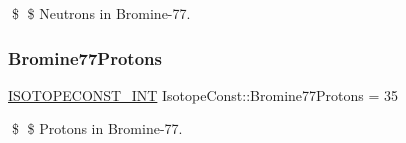 \$ \$ Neutrons in Bromine-\/77. \mbox{\label{group___isotope_const-_bromine-_br77_ga1ea5fd1c2a7636d793f516823bf8c1a8}} 
\subsubsection{\texorpdfstring{Bromine77\+Protons}{Bromine77Protons}}
{\footnotesize\ttfamily \mbox{\hyperlink{group___isotope_const-_macros_ga5f18360b3e99483a35c32d789e62621c}{I\+S\+O\+T\+O\+P\+E\+C\+O\+N\+S\+T\+\_\+\+I\+NT}} Isotope\+Const\+::\+Bromine77\+Protons = 35}

\$ \$ Protons in Bromine-\/77. 